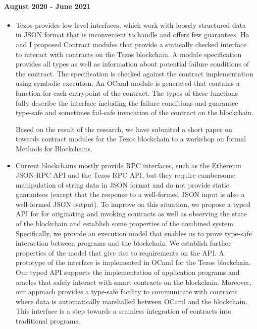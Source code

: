 \documentclass[a4paper,11pt]{article}
\begin{document}
\paragraph{August 2020  - June 2021}
\begin{itemize} 
\item Tezos provides low-level interfaces, which work with loosely structured data in JSON format that is inconvenient to handle and offers few guarantees. Ha and I proposed Contract modules that provide a statically checked interface to interact with contracts on the Tezos blockchain. A module specification provides all types as well as information about potential failure conditions of the contract. The specification is checked against the contract implementation using symbolic execution. An OCaml module is generated that contains a function for each entrypoint of the contract. The types of these functions fully describe the interface including the failure conditions and guarantee type-safe and sometimes fail-safe invocation of the contract on the blockchain.

Based on the result of the research, we have submited a short paper on towards contract modules for the Tezos blockchain to a workshop on formal Methods for Blockchains.

\item Current blockchains mostly provide RPC interfaces, such as the Ethereum JSON-RPC API and the Tezos RPC API, but they require cumbersome manipulation of string data in JSON format and do not provide static
guarantees (except that the response to a well-formed JSON input is also a well-formed JSON output). To improve on this situation, we propose a typed API for for originating and invoking contracts as well as observing the state of the blockchain and establish some properties of the combined system. Specifically, we provide an execution model that enables us to prove type-safe interaction between programs and the blockchain. We establish further properties of the model that give rise to requirements on the API. A prototype of the interface is implemented in OCaml for the Tezos blockchain.  Our typed API supports the
implementation of application programs and oracles that safely interact with
smart contracts on the blockchain. Moreover, our approach provides a type-safe
facility to communicate with contracts where data is automatically marshalled
between OCaml and the blockchain. This interface is a step towards a seamless integration of contracts into traditional programs.


\end{itemize}
\end{document}
